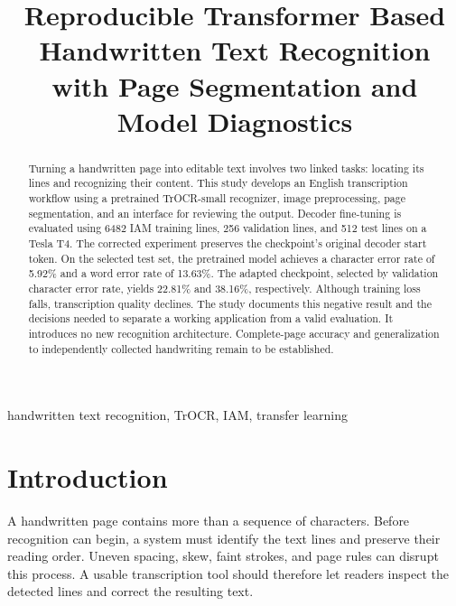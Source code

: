 \documentclass[conference]{IEEEtran}
\begin{document}
\title{Reproducible Transformer Based Handwritten Text Recognition with Page Segmentation and Model Diagnostics}
\author{\and{}\and{}}
\maketitle
\begin{abstract}
Turning a handwritten page into editable text involves two linked tasks: locating its lines and recognizing their content. This study develops an English transcription workflow using a pretrained TrOCR-small recognizer, image preprocessing, page segmentation, and an interface for reviewing the output. Decoder fine-tuning is evaluated using 6482 IAM training lines, 256 validation lines, and 512 test lines on a Tesla T4. The corrected experiment preserves the checkpoint's original decoder start token. On the selected test set, the pretrained model achieves a character error rate of 5.92\% and a word error rate of 13.63\%. The adapted checkpoint, selected by validation character error rate, yields 22.81\% and 38.16\%, respectively. Although training loss falls, transcription quality declines. The study documents this negative result and the decisions needed to separate a working application from a valid evaluation. It introduces no new recognition architecture. Complete-page accuracy and generalization to independently collected handwriting remain to be established.
\end{abstract}
\begin{IEEEkeywords}handwritten text recognition, TrOCR, IAM, transfer learning\end{IEEEkeywords}
\section{Introduction}
A handwritten page contains more than a sequence of characters. Before recognition can begin, a system must identify the text lines and preserve their reading order. Uneven spacing, skew, faint strokes, and page rules can disrupt this process. A usable transcription tool should therefore let readers inspect the detected lines and correct the resulting text.
\end{document}
